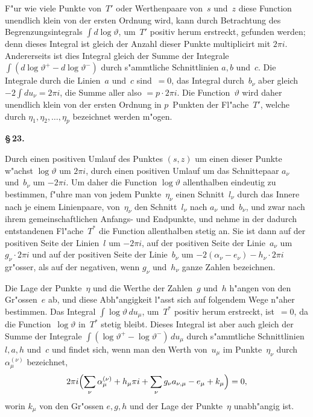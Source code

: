 \documentclass[12pt,a4paper]{book}
\theoremstyle{definition}
\theoremstyle{remark}
\begin{document}
F"ur wie viele Punkte von~$T'$ oder Werthenpaare von~$s$ und~$z$
diese Function unendlich klein von der ersten Ordnung wird, kann durch
Betrachtung des Begrenzungsintegrals $\int d\log\vartheta$, um~$T'$ positiv herum
erstreckt, gefunden werden; denn dieses Integral ist gleich der Anzahl
dieser Punkte multiplicirt mit $2\pi i$. Andererseits ist dies Integral
gleich der Summe der Integrale $\int (d\log\vartheta^+ - d\log\vartheta^-)$ durch
s"ammtliche Schnittlinien $a, b$ und~$c$. Die Integrale durch die Linien~$a$
und~$c$ sind~$= 0$, das Integral durch~$b_\nu$ aber gleich $-2 \int du_\nu = 2\pi i$,
die Summe aller also $= p \cdot 2\pi i$. Die Function~$\vartheta$ wird daher
unendlich klein von der ersten Ordnung in $p$~Punkten der Fl"ache~$T'$,
welche durch $\eta_1, \eta_2, \ldots, \eta_p$ bezeichnet werden m"ogen.

\medskip
\textbf{\S\,23.}

Durch einen positiven Umlauf des Punktes $(s,z)$ um einen dieser
Punkte w"achst $\log\vartheta$ um $2\pi i$, durch einen positiven Umlauf um das
Schnittepaar $a_\nu$ und~$b_\nu$ um $-2\pi i$. Um daher die Function
$\log\vartheta$ allenthalben eindeutig zu bestimmen, f"uhre man von jedem
Punkte~$\eta_\nu$ einen Schnitt~$l_\nu$ durch das Innere nach je einem
Linienpaare, von~$\eta_\nu$ den Schnitt~$l_\nu$ nach $a_\nu$ und~$b_\nu$, und
zwar nach ihrem gemeinschaftlichen Anfangs- und Endpunkte, und nehme
in der dadurch entstandenen Fl"ache~$T^*$ die Function allenthalben stetig
an. Sie ist dann auf der positiven Seite der Linien~$l$ um $-2\pi i$,
auf der positiven Seite der Linie~$a_\nu$ um $g_\nu \cdot 2\pi i$ und auf der
positiven Seite der Linie~$b_\nu$ um $-2(\alpha_\nu - e_\nu) - h_\nu \cdot 2\pi i$
gr"osser, als auf der negativen, wenn $g_\nu$ und~$h_\nu$ ganze Zahlen bezeichnen.

Die Lage der Punkte~$\eta$ und die Werthe der Zahlen~$g$ und~$h$
h"angen von den Gr"ossen~$e$ ab, und diese Abh"angigkeit l"asst sich auf
folgendem Wege n"aher bestimmen. Das Integral $\int \log\vartheta\, du_\mu$,
um~$T^*$ positiv herum erstreckt, ist~$= 0$, da die Function~$\log\vartheta$
in~$T^*$ stetig bleibt. Dieses Integral ist aber auch gleich der Summe
der Integrale $\int (\log\vartheta^+ - \log\vartheta^-)\, du_\mu$ durch s"ammtliche
Schnittlinien $l, a, h$ und~$c$ und findet sich, wenn man den Werth von~$u_\mu$
im Punkte~$\eta_\nu$ durch~$\alpha_\mu^{(\nu)}$ bezeichnet,
\[
2\pi i \Bigl(\sum_\nu \alpha_\mu^{(\nu)} + h_\mu \pi i + \sum_\nu g_\nu a_{\nu,\mu}
  - e_\mu + k_\mu\Bigr) = 0,
\]
worin $k_\mu$ von den Gr"ossen $e, g, h$ und der Lage der Punkte~$\eta$
unabh"angig ist.
\end{document}
